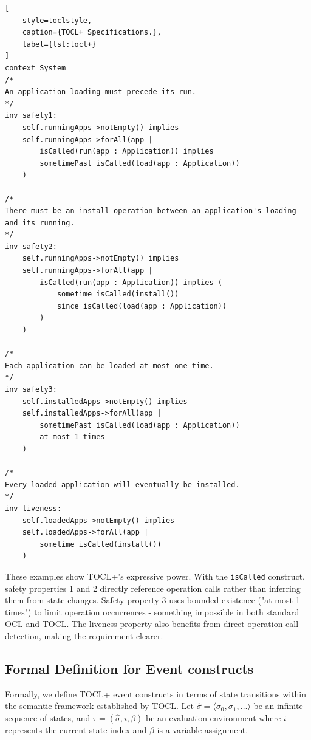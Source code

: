 \begin{lstlisting}[
    style=toclstyle, 
    caption={TOCL+ Specifications.}, 
    label={lst:tocl+}
]
context System
/*
An application loading must precede its run.
*/
inv safety1: 
    self.runningApps->notEmpty() implies
    self.runningApps->forAll(app |
        isCalled(run(app : Application)) implies
        sometimePast isCalled(load(app : Application))
    )

/*
There must be an install operation between an application's loading and its running.
*/
inv safety2: 
    self.runningApps->notEmpty() implies
    self.runningApps->forAll(app |
        isCalled(run(app : Application)) implies (
            sometime isCalled(install())
            since isCalled(load(app : Application))
        )
    )

/*
Each application can be loaded at most one time.
*/
inv safety3:
    self.installedApps->notEmpty() implies
    self.installedApps->forAll(app |
        sometimePast isCalled(load(app : Application))
        at most 1 times
    )

/*
Every loaded application will eventually be installed.
*/
inv liveness:
    self.loadedApps->notEmpty() implies
    self.loadedApps->forAll(app | 
        sometime isCalled(install())
    )
\end{lstlisting}

These examples show TOCL+'s expressive power. With the \texttt{isCalled} construct, 
safety properties 1 and 2 directly reference operation calls rather than inferring 
them from state changes. Safety property 3 uses bounded existence ("at most 1 times") 
to limit operation occurrences - something impossible in both standard OCL and TOCL. 
The liveness property also benefits from direct operation call detection, making 
the requirement clearer.


\subsection{Formal Definition for Event constructs}

\hspace{1cm} Formally, we define TOCL+ event constructs in terms of state transitions 
within the semantic framework established by TOCL. Let 
$\hat{\sigma} = \langle \sigma_0, \sigma_1, \ldots \rangle$ 
be an infinite sequence of states, and 
$\tau = (\hat{\sigma}, i, \beta)$ 
be an evaluation environment where $i$ represents the current state index and $\beta$ 
is a variable assignment.


